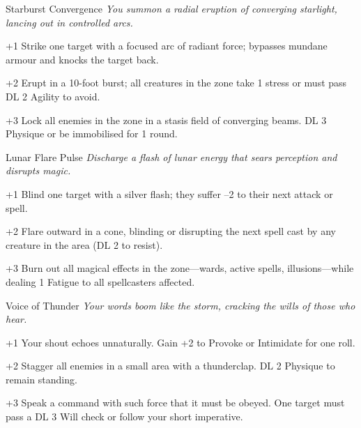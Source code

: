 \begin{WyrdSpell}[Astral]{Starburst Convergence}\label{spell:starburst-convergence}
    \textit{You summon a radial eruption of converging starlight, lancing out in controlled arcs.}
    
    \begin{WyrdSpellBlock}
        \item[+1] Strike one target with a focused arc of radiant force; bypasses mundane armour and knocks the target back.
        
        \item[+2] Erupt in a 10-foot burst; all creatures in the zone take 1 stress or must pass DL 2 Agility to avoid.
        
        \item[+3] Lock all enemies in the zone in a stasis field of converging beams. DL 3 Physique or be immobilised for 1 round.
    \end{WyrdSpellBlock}
\end{WyrdSpell}

\begin{WyrdSpell}[Elemental]{Lunar Flare Pulse}\label{spell:lunar-flare-pulse}
    \textit{Discharge a flash of lunar energy that sears perception and disrupts magic.}
    
    \begin{WyrdSpellBlock}
        \item[+1] Blind one target with a silver flash; they suffer –2 to their next attack or spell.
        
        \item[+2] Flare outward in a cone, blinding or disrupting the next spell cast by any creature in the area (DL 2 to resist).
        
        \item[+3] Burn out all magical effects in the zone—wards, active spells, illusions—while dealing 1 Fatigue to all spellcasters affected.
    \end{WyrdSpellBlock}
\end{WyrdSpell}

\begin{WyrdSpell}[Stormcalling]{Voice of Thunder}
\textit{Your words boom like the storm, cracking the wills of those who hear.}
    \begin{WyrdSpellBlock}
        \item[+1] Your shout echoes unnaturally. Gain +2 to Provoke or Intimidate for one roll.
        \item[+2] Stagger all enemies in a small area with a thunderclap. DL 2 Physique to remain standing.
        \item[+3] Speak a command with such force that it must be obeyed. One target must pass a DL 3 Will check or follow your short imperative.
    \end{WyrdSpellBlock}
\end{WyrdSpell}

